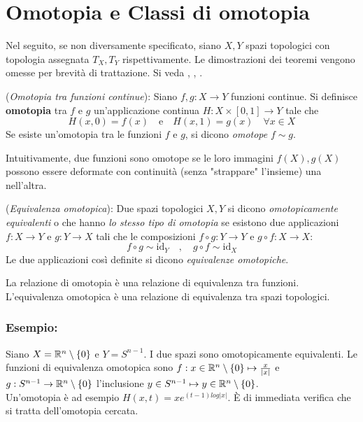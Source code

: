 \section{Omotopia e Classi di omotopia}
Nel seguito, se non diversamente specificato, siano $X,Y$ spazi topologici con
topologia assegnata $T_X , T_Y$ rispettivamente.
Le dimostrazioni dei teoremi vengono omesse per brevità di trattazione. Si veda
\cite{sernesi}, \cite{fulton}, \cite{nakahara}.

\begin{definition}(\emph{Omotopia tra funzioni continue}):
   Siano $f,g : X \to Y$ funzioni continue. Si definisce \textbf{omotopia} tra
   $f$ e $g$ un'applicazione continua $H : X \times [0,1] \to Y$ tale che
   $$ H(x,0) = f(x) \quad \mathrm{e} \quad H(x,1) = g(x) \quad \forall x \in X$$
   Se esiste un'omotopia tra le funzioni $f$ e $g$, si dicono \emph{omotope} $f \sim g$.
   \label{def:omotopia}
\end{definition}

Intuitivamente, due funzioni sono omotope se le loro immagini $f(X),g(X)$ possono essere
deformate con continuità (senza "strappare" l'insieme) una nell'altra.

\begin{definition}(\emph{Equivalenza omotopica}):
   Due spazi topologici $X,Y$ si dicono \emph{omotopicamente equivalenti} o che hanno
   \emph{lo stesso tipo di omotopia} se esistono due applicazioni $f : X \to Y$ e
   $g : Y \to X$ tali che le composizioni $f \circ g : Y \to Y$ e
   $g \circ f : X \to X$:
      $$  f \circ g \sim \mathrm{id}_Y \quad , \quad g \circ f \sim \mathrm{id}_X $$
   Le due applicazioni così definite si dicono \emph{equivalenze omotopiche}.
\end{definition}

\begin{lemma}
   La relazione di omotopia è una relazione di equivalenza tra funzioni.
   L'equivalenza omotopica è una relazione di equivalenza tra spazi topologici.
\end{lemma}

\subsubsection{Esempio:}
\begin{example}
   Siano $X = \mathbb{R}^n\setminus\{0\}$ e $Y = S^{n-1}$. I due spazi sono
   omotopicamente equivalenti. Le funzioni di equivalenza omotopica sono
   $f : x \in \mathbb{R}^n\setminus\{0\} \mapsto \frac{x}{|x|}$ e
   $g : S^{n-1} \to \mathbb{R}^n\setminus\{0\}$ l'inclusione
   $y \in S^{n-1} \mapsto y \in \mathbb{R}^n\setminus\{0\}$. \\
   Un'omotopia è ad esempio $H(x,t) = x e^{(t-1)log|x|}$. È di immediata verifica
   che si tratta dell'omotopia cercata.
\end{example}

